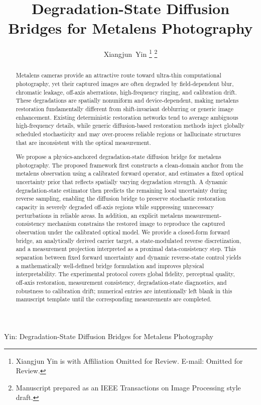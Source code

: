 \documentclass[journal]{IEEEtran}
\begin{document}
\title{Degradation-State Diffusion Bridges for Metalens Photography}

\author{Xiangjun~Yin%
\thanks{Xiangjun Yin is with Affiliation Omitted for Review. E-mail: Omitted for Review.}%
\thanks{Manuscript prepared as an IEEE Transactions on Image Processing style draft.}
}

%
{Yin: Degradation-State Diffusion Bridges for Metalens Photography}

\maketitle

\begin{abstract}
Metalens cameras provide an attractive route toward ultra-thin computational photography, yet their captured images are often degraded by field-dependent blur, chromatic leakage, off-axis aberrations, high-frequency ringing, and calibration drift. These degradations are spatially nonuniform and device-dependent, making metalens restoration fundamentally different from shift-invariant deblurring or generic image enhancement. Existing deterministic restoration networks tend to average ambiguous high-frequency details, while generic diffusion-based restoration methods inject globally scheduled stochasticity and may over-process reliable regions or hallucinate structures that are inconsistent with the optical measurement.

We propose a physics-anchored degradation-state diffusion bridge for metalens photography. The proposed framework first constructs a clean-domain anchor from the metalens observation using a calibrated forward operator, and estimates a fixed optical uncertainty prior that reflects spatially varying degradation strength. A dynamic degradation-state estimator then predicts the remaining local uncertainty during reverse sampling, enabling the diffusion bridge to preserve stochastic restoration capacity in severely degraded off-axis regions while suppressing unnecessary perturbations in reliable areas. In addition, an explicit metalens measurement-consistency mechanism constrains the restored image to reproduce the captured observation under the calibrated optical model. We provide a closed-form forward bridge, an analytically derived carrier target, a state-modulated reverse discretization, and a measurement projection interpreted as a proximal data-consistency step. This separation between fixed forward uncertainty and dynamic reverse-state control yields a mathematically well-defined bridge formulation and improves physical interpretability. The experimental protocol covers global fidelity, perceptual quality, off-axis restoration, measurement consistency, degradation-state diagnostics, and robustness to calibration drift; numerical entries are intentionally left blank in this manuscript template until the corresponding measurements are completed.
\end{abstract}
\end{document}
